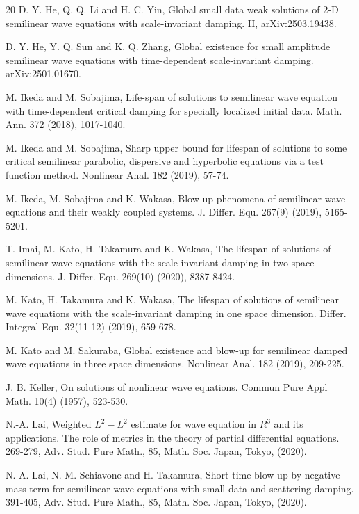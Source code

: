 \documentclass[review]{elsarticle}
\begin{document}
\begin{thebibliography}{20}
D. Y. He, Q. Q. Li and H. C. Yin,
Global small data weak solutions of 2-D semilinear wave equations with scale-invariant damping. II, arXiv:2503.19438.

D. Y. He, Y. Q. Sun and K. Q. Zhang,
Global existence for small amplitude semilinear wave equations with time-dependent scale-invariant damping. arXiv:2501.01670.





M. Ikeda and M. Sobajima, Life-span of solutions to semilinear wave equation with time-dependent critical damping
for specially localized initial data. Math. Ann. 372 (2018), 1017-1040.

M. Ikeda and M. Sobajima, Sharp upper bound for lifespan of solutions to some critical semilinear parabolic, dispersive and hyperbolic equations via a test function method. Nonlinear Anal. 182 (2019), 57-74.

M. Ikeda, M. Sobajima and K. Wakasa, Blow-up phenomena of semilinear wave equations and their weakly coupled systems. J. Differ. Equ. 267(9) (2019), 5165-5201.

T. Imai, M. Kato, H. Takamura and K. Wakasa,
The lifespan of solutions of semilinear wave equations with the scale-invariant damping in two space dimensions.
J. Differ. Equ. 269(10) (2020), 8387-8424.




M. Kato, H. Takamura and K. Wakasa, The lifespan of solutions of semilinear wave equations with the scale-invariant damping in one space dimension. Differ. Integral Equ. 32(11-12) (2019), 659-678.


M. Kato and M. Sakuraba, Global existence and blow-up for semilinear damped wave equations in three space dimensions. Nonlinear Anal. 182 (2019), 209-225.

J. B. Keller, On solutions of nonlinear wave equations. Commun Pure Appl Math. 10(4) (1957), 523-530.





N.-A. Lai, Weighted $L^2-L^2$ estimate for wave equation in $R^3$ and its applications. The role of metrics in the theory of partial differential equations. 269-279, Adv. Stud. Pure Math., 85, Math. Soc. Japan, Tokyo, (2020).


N.-A. Lai, N. M. Schiavone and H. Takamura, Short time blow-up by negative mass term for semilinear wave equations with small data and scattering damping. 391-405, Adv. Stud. Pure Math., 85, Math. Soc. Japan, Tokyo, (2020).


\end{thebibliography}
\end{document}
